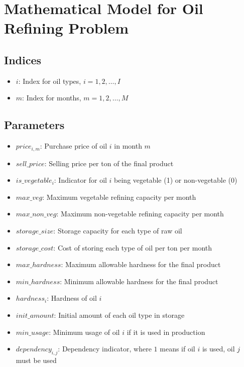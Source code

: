 \documentclass{article}
\begin{document}
\section*{Mathematical Model for Oil Refining Problem}

\subsection*{Indices}
\begin{itemize}
    \item $i$: Index for oil types, $i = 1, 2, \ldots, I$
    \item $m$: Index for months, $m = 1, 2, \ldots, M$
\end{itemize}

\subsection*{Parameters}
\begin{itemize}
    \item $price_{i,m}$: Purchase price of oil $i$ in month $m$
    \item $sell\_price$: Selling price per ton of the final product
    \item $is\_vegetable_{i}$: Indicator for oil $i$ being vegetable (1) or non-vegetable (0)
    \item $max\_veg$: Maximum vegetable refining capacity per month
    \item $max\_non\_veg$: Maximum non-vegetable refining capacity per month
    \item $storage\_size$: Storage capacity for each type of raw oil
    \item $storage\_cost$: Cost of storing each type of oil per ton per month
    \item $max\_hardness$: Maximum allowable hardness for the final product
    \item $min\_hardness$: Minimum allowable hardness for the final product
    \item $hardness_{i}$: Hardness of oil $i$
    \item $init\_amount$: Initial amount of each oil type in storage
    \item $min\_usage$: Minimum usage of oil $i$ if it is used in production
    \item $dependency_{i,j}$: Dependency indicator, where $1$ means if oil $i$ is used, oil $j$ must be used
\end{itemize}
\end{document}
